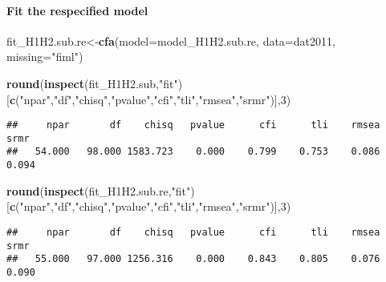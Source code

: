 \documentclass[
]{article}
\newenvironment{Shaded}{\begin{snugshade}}{\end{snugshade}}
\newcommand{\DataTypeTok}[1]{\textcolor[rgb]{0.13,0.29,0.53}{#1}}
\newcommand{\DecValTok}[1]{\textcolor[rgb]{0.00,0.00,0.81}{#1}}
\newcommand{\KeywordTok}[1]{\textcolor[rgb]{0.13,0.29,0.53}{\textbf{#1}}}
\newcommand{\NormalTok}[1]{#1}
\newcommand{\StringTok}[1]{\textcolor[rgb]{0.31,0.60,0.02}{#1}}
\begin{document}
\hypertarget{fit-the-respecified-model-1}{%
\paragraph{Fit the respecified
model}\label{fit-the-respecified-model-1}}

\begin{Shaded}
\begin{Highlighting}[]
\NormalTok{fit_H1H2.sub.re<-}\KeywordTok{cfa}\NormalTok{(}\DataTypeTok{model=}\NormalTok{model_H1H2.sub.re,}
              \DataTypeTok{data=}\NormalTok{dat2011,}
              \DataTypeTok{missing=}\StringTok{"fiml"}\NormalTok{)}
\end{Highlighting}
\end{Shaded}

\begin{Shaded}
\begin{Highlighting}[]
\KeywordTok{round}\NormalTok{(}\KeywordTok{inspect}\NormalTok{(fit_H1H2.sub,}\StringTok{"fit"}\NormalTok{)}
\NormalTok{      [}\KeywordTok{c}\NormalTok{(}\StringTok{"npar"}\NormalTok{,}\StringTok{"df"}\NormalTok{,}\StringTok{"chisq"}\NormalTok{,}\StringTok{"pvalue"}\NormalTok{,}\StringTok{"cfi"}\NormalTok{,}\StringTok{"tli"}\NormalTok{,}\StringTok{"rmsea"}\NormalTok{,}\StringTok{"srmr"}\NormalTok{)],}\DecValTok{3}\NormalTok{)}
\end{Highlighting}
\end{Shaded}

\begin{verbatim}
##     npar       df    chisq   pvalue      cfi      tli    rmsea     srmr 
##   54.000   98.000 1583.723    0.000    0.799    0.753    0.086    0.094
\end{verbatim}

\begin{Shaded}
\begin{Highlighting}[]
\KeywordTok{round}\NormalTok{(}\KeywordTok{inspect}\NormalTok{(fit_H1H2.sub.re,}\StringTok{"fit"}\NormalTok{)}
\NormalTok{      [}\KeywordTok{c}\NormalTok{(}\StringTok{"npar"}\NormalTok{,}\StringTok{"df"}\NormalTok{,}\StringTok{"chisq"}\NormalTok{,}\StringTok{"pvalue"}\NormalTok{,}\StringTok{"cfi"}\NormalTok{,}\StringTok{"tli"}\NormalTok{,}\StringTok{"rmsea"}\NormalTok{,}\StringTok{"srmr"}\NormalTok{)],}\DecValTok{3}\NormalTok{)}
\end{Highlighting}
\end{Shaded}

\begin{verbatim}
##     npar       df    chisq   pvalue      cfi      tli    rmsea     srmr 
##   55.000   97.000 1256.316    0.000    0.843    0.805    0.076    0.090
\end{verbatim}
\end{document}
